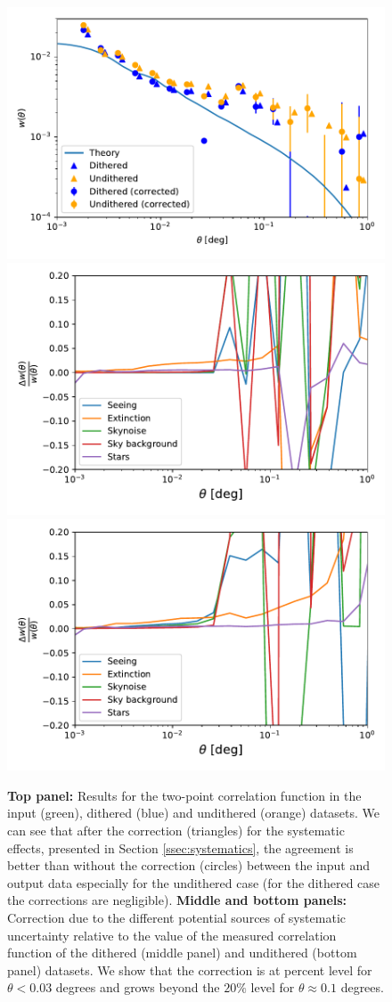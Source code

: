 \documentclass[twocolumn]{aastex62}
\begin{document}
\begin{figure}
\centering
\includegraphics[width=0.9\columnwidth]{w_comp_corr25p3.pdf}
\includegraphics[width=0.9\columnwidth]{sys_dithered_25p3_v2.pdf}
\includegraphics[width=0.9\columnwidth]{sys_undithered_25p3_v2.pdf}
\caption{{\bf Top panel:} Results for the two-point correlation function in the input (green), dithered (blue) and undithered (orange) datasets. We can see that after the correction (triangles) for the systematic effects, presented in Section \ref{ssec:systematics}, the agreement is better than without the correction (circles) between the input and output data especially for the undithered case (for the dithered case the corrections are negligible). {\bf Middle and bottom panels:} Correction due to the different potential sources of systematic uncertainty relative to the value of the measured correlation function of the dithered (middle panel) and undithered (bottom panel) datasets. We show that the correction is at percent level for $\theta<0.03$ degrees and grows beyond the $20\%$ level for $\theta \approx 0.1$ degrees.}

\end{figure}
\end{document}
